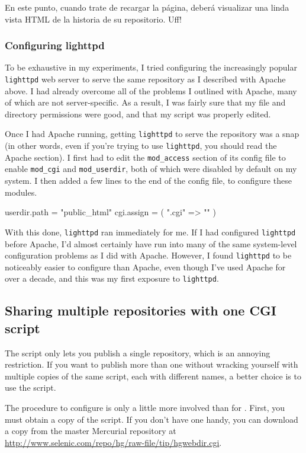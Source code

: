 En este punto, cuando trate de recargar la página, deberá visualizar
una linda vista HTML de la historia de su repositorio. Uff!

\subsubsection{Configuring lighttpd}

To be exhaustive in my experiments, I tried configuring the
increasingly popular \texttt{lighttpd} web server to serve the same
repository as I described with Apache above.  I had already overcome
all of the problems I outlined with Apache, many of which are not
server-specific.  As a result, I was fairly sure that my file and
directory permissions were good, and that my 
script was properly edited.

Once I had Apache running, getting \texttt{lighttpd} to serve the
repository was a snap (in other words, even if you're trying to use
\texttt{lighttpd}, you should read the Apache section).  I first had
to edit the \texttt{mod\_access} section of its config file to enable
\texttt{mod\_cgi} and \texttt{mod\_userdir}, both of which were
disabled by default on my system.  I then added a few lines to the end
of the config file, to configure these modules.
\begin{codesample2}
  userdir.path = "public_html"
  cgi.assign = ( ".cgi" => "" )
\end{codesample2}
With this done, \texttt{lighttpd} ran immediately for me.  If I had
configured \texttt{lighttpd} before Apache, I'd almost certainly have
run into many of the same system-level configuration problems as I did
with Apache.  However, I found \texttt{lighttpd} to be noticeably
easier to configure than Apache, even though I've used Apache for over
a decade, and this was my first exposure to \texttt{lighttpd}.

\subsection{Sharing multiple repositories with one CGI script}

The  script only lets you publish a single
repository, which is an annoying restriction.  If you want to publish
more than one without wracking yourself with multiple copies of the
same script, each with different names, a better choice is to use the
 script.

The procedure to configure  is only a little
more involved than for .  First, you must obtain
a copy of the script.  If you don't have one handy, you can download a
copy from the master Mercurial repository at
\url{http://www.selenic.com/repo/hg/raw-file/tip/hgwebdir.cgi}.

